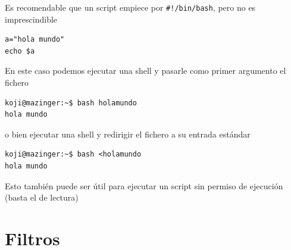 \documentclass[ucs]{beamer}
\begin{document}
\begin{frame}[fragile]
Es recomendable que un script empiece por \verb|#!/bin/bash|, pero
no es imprescindible

  \begin{footnotesize}
  \begin{verbatim}
a="hola mundo"
echo $a 
  \end{verbatim}
  \end{footnotesize}

En este caso podemos ejecutar una shell y pasarle como
primer argumento el fichero

  \begin{footnotesize}
  \begin{verbatim}
koji@mazinger:~$ bash holamundo 
hola mundo
  \end{verbatim}
  \end{footnotesize}

o bien ejecutar una shell y redirigir el fichero a su entrada estándar
  \begin{footnotesize}
  \begin{verbatim}
koji@mazinger:~$ bash <holamundo 
hola mundo
  \end{verbatim}
  \end{footnotesize}


Esto también puede ser útil para ejecutar un script sin permiso
de ejecución (basta el de lectura)

\end{frame}
\section{Filtros}
\end{document}
